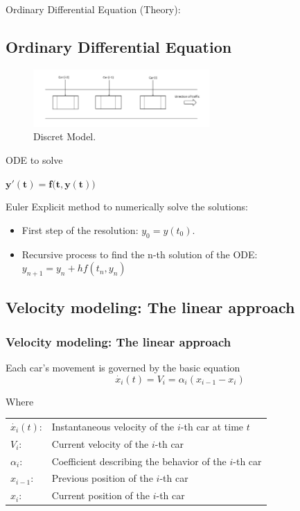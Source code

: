 \documentclass{beamer}
\begin{document}
\begin{frame}{Ordinary Differential Equation (Theory):}
\subsection{Ordinary Differential Equation}
\begin{figure}
    \centering
    \includegraphics[width=0.6\textwidth]{discret.png} 
    \caption{ Discret Model.}
\end{figure}
\vspace{-0.7cm}
\begin{block}{ODE to solve}
	\begin{center}
		$\boxed{\mathbf{y'(t) = f{\bigl (}t, y(t){\bigr )}}}$
	\end{center}
	Euler Explicit method to numerically solve the solutions:
	\begin{itemize}
		\item First step of the resolution: $\boxed{y_0 = y(t_0)}$.
		\item Recursive process to find the n-th solution of the ODE: $\boxed{y_{n+1} = y_{n} + hf(t_{n}, y_{n})}$
	\end{itemize}
\end{block}


    
\end{frame}
\begin{frame}
\subsection{Velocity modeling: The linear approach}
\frametitle{Velocity modeling: The linear approach}

    \begin{alertblock}{Each car's movement is governed by the basic equation}
    	\[
    	\boxed{\dot{x_i}(t) = V_i = \alpha_i(x_{i-1} - x_i)}
    	\]
    \end{alertblock}
    
    \begin{block}{Where}
    	\begin{center}
    		\begin{tabular}{l l}
    			\(\dot{x_i}(t)\): & Instantaneous velocity of the \(i\)-th car at time \(t\) \\
    			\(V_i\): & Current velocity of the \(i\)-th car \\
    			\(\alpha_i\): & Coefficient describing the behavior of the \(i\)-th car \\
    			\(x_{i-1}\): & Previous position of the \(i\)-th car \\
    			\(x_i\): & Current position of the \(i\)-th car
    		\end{tabular}
    	\end{center}
    \end{block}
\end{frame}
\end{document}
